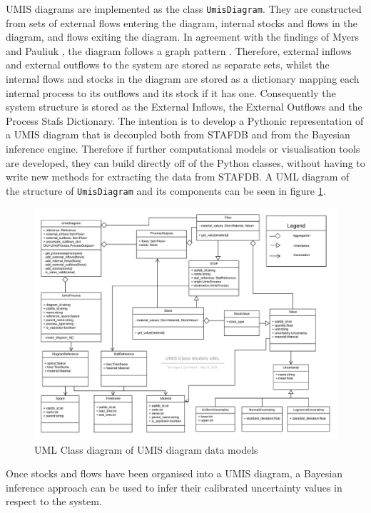 \documentclass[ %
                    author={Tom Jager},
                supervisor={Dr. Daniel Schien},
                    degree={MEng},
                     title={A Bayesian Inference Engine for Calibrating Uncertainty over UMIS Structured MFA Systems},
                  subtitle={},
                      type={research},
                      year={2019} ]{dissertation}
\begin{document}
UMIS diagrams are implemented as the class \texttt{UmisDiagram}. They are constructed from sets of external flows entering the diagram, internal stocks and flows in the diagram, and flows exiting the diagram. In agreement with the findings of Myers and Pauliuk \cite{myers2019unified, pauliuk2015general}, the diagram follows a graph pattern \cite{klein}. Therefore, external inflows and external outflows to the system are stored as separate sets, whilst the internal flows and stocks in the diagram are stored as a dictionary mapping each internal process to its outflows and its stock if it has one. Consequently the system structure is stored as the External Inflows, the External Outflows and the Process Stafs Dictionary. The intention is to develop a Pythonic representation of a UMIS diagram that is decoupled both from STAFDB and from the Bayesian inference engine. Therefore if further computational models or visualisation tools are developed, they can build directly off of the Python classes, without having to write new methods for extracting the data from STAFDB. A UML diagram of the structure of \texttt{UmisDiagram} and its components can be seen in figure \ref{fig:UmisDiagram}.

\begin{figure}
    \centering
    \includegraphics[width=\textwidth]{images/UMIS-data-models.png}
    \caption{UML Class diagram of UMIS diagram data models}
    \label{fig:UmisDiagram}
\end{figure}

Once stocks and flows have been organised into a UMIS diagram, a Bayesian inference approach can be used to infer their calibrated uncertainty values in respect to the system.
\end{document}

